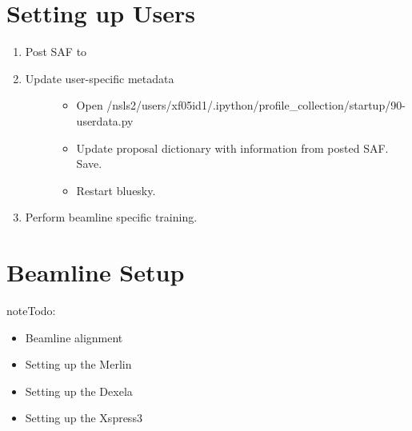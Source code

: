 \documentclass[letterpaper,10pt,english]{sphinxmanual}
\begin{document}
\section{Setting up Users}
\label{\detokenize{staff:setting-up-users}}\begin{enumerate}
\def\theenumi{\arabic{enumi}}
\def\labelenumi{\theenumi .}
\makeatletter\def\p@enumii{\p@enumi \theenumi .}\makeatother
\item {} 
Post SAF to 

\item {} \begin{description}
\item[{Update user-specific metadata}] \leavevmode\begin{itemize}
\item {} 
Open /nsls2/users/xf05id1/.ipython/profile\_collection/startup/90-userdata.py

\item {} 
Update proposal dictionary with information from posted SAF. Save.

\item {} 
Restart bluesky.

\end{itemize}

\end{description}

\item {} 
Perform beamline specific training. 

\end{enumerate}


\section{Beamline Setup}
\label{\detokenize{staff:beamline-setup}}

\begin{sphinxadmonition}{note}{\label{staff:index-1}Todo:}\begin{itemize}
\item {} 
Beamline alignment

\item {} 
Setting up the Merlin

\item {} 
Setting up the Dexela

\item {} 
Setting up the Xspress3

\end{itemize}
\end{sphinxadmonition}
\end{document}
